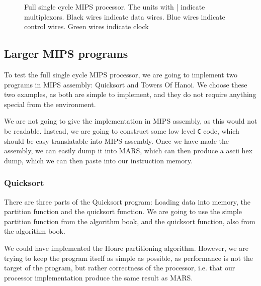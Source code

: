 \begin{figure}
{
    }
    \caption{Full single cycle MIPS processor. The units with | indicate
    multiplexors. Black wires indicate data wires. Blue wires indicate control
    wires. Green wires indicate clock}
    \label{fig:single-proc-full}
\end{figure}
\subsection{Larger MIPS programs}
To test the full single cycle MIPS processor, we are going to implement two
programs in MIPS assembly: Quicksort and Towers Of Hanoi. We choose these two
examples, as both are simple to implement, and they do not require anything
special from the environment.

We are not going to give the implementation in MIPS assembly, as this would not
be readable. Instead, we are going to construct some low level \texttt{C} code,
which should be easy translatable into MIPS assembly. Once we have made the
assembly, we can easily dump it into MARS, which can then produce a ascii hex
dump, which we can then paste into our instruction memory.

\subsubsection*{Quicksort}
There are three parts of the Quicksort program: Loading data into memory,
the partition function and the quicksort function. We are going to use the
simple partition function from the algorithm book\cite{ref:alg}, and the
quicksort function, also from the algorithm book.

We could have implemented the Hoare partitioning algorithm. However, we are
trying to keep the program itself as simple as possible, as performance is not
the target of the program, but rather correctness of the processor, i.e.  that
our processor implementation produce the same result as MARS.

